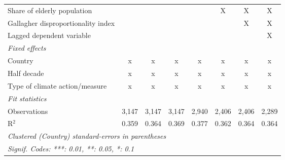 \begin{tabular}{lccccccc}
   Share of elderly population                                                   &              &              &               &              & X              & X              & X\\  
   Gallagher disproportionality index                                            &              &              &               &              &                & X              & X\\  
   Lagged dependent variable                                                     &              &              &               &              &                &                & X\\  
   \emph{Fixed effects}\\
   Country                                                                       & x            & x            & x             & x            & x              & x              & x\\  
   Half decade                                                                   & x            & x            & x             & x            & x              & x              & x\\  
   Type of climate action/measure                                                & x            & x            & x             & x            & x              & x              & x\\  
   \midrule \emph{Fit statistics}\\
   Observations                                                                  & 3,147        & 3,147        & 3,147         & 2,940        & 2,406          & 2,406          & 2,289\\  
   R$^2$                                                                         & 0.359        & 0.364        & 0.369         & 0.377        & 0.362          & 0.364          & 0.364\\  
   \midrule
   \multicolumn{8}{l}{\emph{Clustered (Country) standard-errors in parentheses}}\\
   \multicolumn{8}{l}{\emph{Signif. Codes: ***: 0.01, **: 0.05, *: 0.1}}\\
\end{tabular}
\par\endgroup


